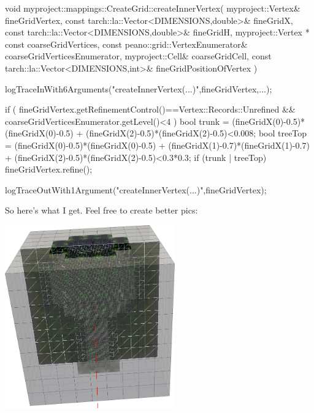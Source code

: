\begin{code}

void myproject::mappings::CreateGrid::createInnerVertex(
 myproject::Vertex&                          fineGridVertex,
 const tarch::la::Vector<DIMENSIONS,double>& fineGridX,
 const tarch::la::Vector<DIMENSIONS,double>& fineGridH,
 myproject::Vertex * const                   coarseGridVertices,
 const peano::grid::VertexEnumerator&      coarseGridVerticesEnumerator,
 myproject::Cell&                            coarseGridCell,
 const tarch::la::Vector<DIMENSIONS,int>&    fineGridPositionOfVertex 
) {
 logTraceInWith6Arguments("createInnerVertex(...)",fineGridVertex,...);
  
 if (
   fineGridVertex.getRefinementControl()==Vertex::Records::Unrefined 
   &&
   coarseGridVerticesEnumerator.getLevel()<4
 ) {
   bool trunk = (fineGridX(0)-0.5)*(fineGridX(0)-0.5)
              + (fineGridX(2)-0.5)*(fineGridX(2)-0.5)<0.008;
   bool treeTop = (fineGridX(0)-0.5)*(fineGridX(0)-0.5)
                + (fineGridX(1)-0.7)*(fineGridX(1)-0.7)
                + (fineGridX(2)-0.5)*(fineGridX(2)-0.5)<0.3*0.3;
   if (trunk | treeTop) {
     fineGridVertex.refine();
   }
 }

 logTraceOutWith1Argument("createInnerVertex(...)",fineGridVertex);
}
\end{code}

So here's what I get. Feel free to create better pics:

\begin{center}
  \includegraphics[width=0.55\textwidth]{10_quickstart/tree.png}
\end{center}

